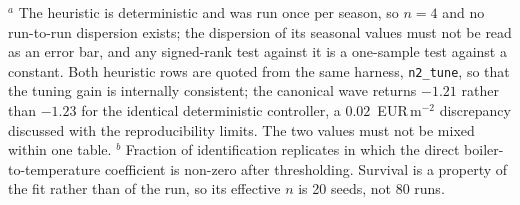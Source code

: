 \begin{table}[htbp]
\vspace{2pt}
\footnotesize $^{a}$ The heuristic is deterministic and was run once per season,
so $n=4$ and no run-to-run dispersion exists; the dispersion of its seasonal
values must not be read as an error bar, and any signed-rank test against it is
a one-sample test against a constant. Both heuristic rows are quoted from the
same harness, \texttt{n2\_tune}, so that the tuning gain is internally
consistent; the canonical wave returns $-1.21$ rather than $-1.23$ for the
identical deterministic controller, a $0.02$~EUR\,m$^{-2}$ discrepancy
discussed with the reproducibility limits. The two values must not be mixed
within one table. $^{b}$ Fraction of identification replicates in which the
direct boiler-to-temperature coefficient is non-zero after thresholding.
Survival is a property of the fit rather than of the run, so its effective $n$
is 20 seeds, not 80 runs.
\end{table}

